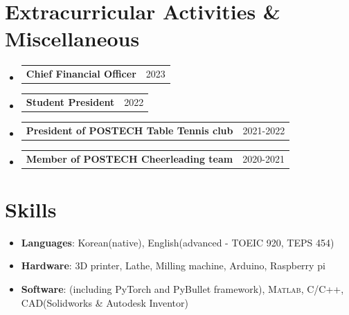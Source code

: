 \documentclass[letterpaper,11pt]{article}
\makeatletter
\newcommand{\resumeItem}[2]{
  \item\small{
    \textbf{#1}{: #2 \vspace{-2pt}}
  }
}
\newcommand{\resumeSubheadingtwo}[3]{
  \vspace{-1pt}\item[]
    \begin{tabular*}{0.97\textwidth}{l@{\extracolsep{\fill}}r}
      \textbf{#1}\text{ #2} & #3 \\
    \end{tabular*}\vspace{-5pt}
}
\newcommand{\resumeSubItem}[2]{\resumeItem{#1}{#2}\vspace{-4pt}}
\newcommand{\resumeSubHeadingListStart}{\begin{itemize}[leftmargin=*]}
\newcommand{\resumeSubHeadingListEnd}{\end{itemize}}
\makeatother
\begin{document}
\section{Extracurricular Activities \& Miscellaneous}
  \resumeSubHeadingListStart
    \resumeSubheadingtwo
    {Chief Financial Officer}{(Undergraduate Association, POSTECH)}{2023}
    \resumeSubheadingtwo
    {Student President}{(Dept. of M.E., POSTECH)}{2022}
    \resumeSubheadingtwo
    {President of POSTECH Table Tennis club}{}{2021-2022}
    \resumeSubheadingtwo
    {Member of POSTECH Cheerleading team}{}{2020-2021}
  \resumeSubHeadingListEnd


\section{Skills}
 \resumeSubHeadingListStart
    \resumeSubItem{Languages}{Korean(native), English(advanced - TOEIC 920, TEPS 454)}
    \resumeSubItem{Hardware}{3D printer, Lathe, Milling machine, Arduino, Raspberry pi}
    \resumeSubItem{Software}{\faPython(including PyTorch and PyBullet framework), \textsc{Matlab}\xspace, C/C++, CAD(Solidworks \& Autodesk Inventor)}
 \resumeSubHeadingListEnd



\end{document}
